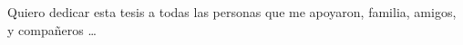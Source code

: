 
\begin{dedication} 

Quiero dedicar esta tesis a todas las personas que me apoyaron, familia, amigos, y compañeros \dots

\end{dedication}